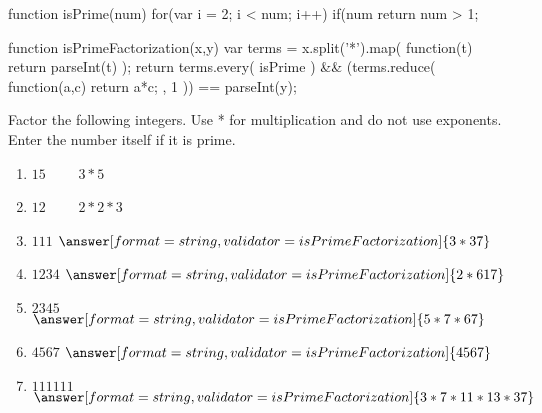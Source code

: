 \documentclass[nooutcomes]{ximera}
\begin{document}


\begin{javascript}
function isPrime(num) {
  for(var i = 2; i < num; i++)
    if(num %
  return num > 1;
}

function isPrimeFactorization(x,y) {
  var terms = x.split('*').map( function(t) { return parseInt(t) } );
  return terms.every( isPrime ) &&
    (terms.reduce( function(a,c) { return a*c; }, 1 )) == parseInt(y);
}
\end{javascript}



\begin{problem}
Factor the following integers.  Use * for multiplication and do not use exponents.  Enter the number itself if it is prime.
\begin{enumerate}
\item $15\qquad$ $3*5$
\item $12\qquad$ $2*2*3$
\item $111$     $\answer[format=string,validator=isPrimeFactorization]{3*37}$
\item $1234$    $\answer[format=string,validator=isPrimeFactorization]{2*617}$
\item $2345$    $\answer[format=string,validator=isPrimeFactorization]{5*7*67}$
\item $4567$    $\answer[format=string,validator=isPrimeFactorization]{4567}$
\item $111111$  $\answer[format=string,validator=isPrimeFactorization]{3*7*11*13*37}$
\end{enumerate}
\end{problem}
\end{document}
